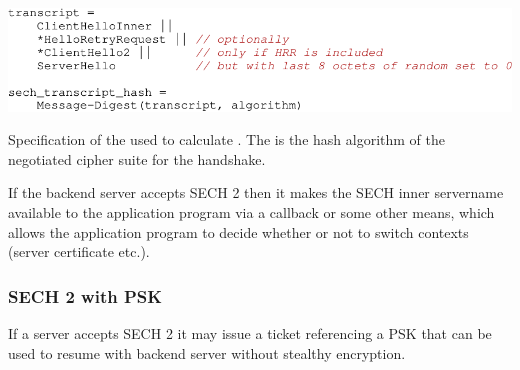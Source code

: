 \begin{listing}[htb]
\centering
\includegraphics[width=\linewidth]{figure/sech2-transcript-hash.pdf}
\captionsetup{width=.8\linewidth} 
\caption[SECH 2 Transcript Hash]{Specification of the  used to calculate . The  is the hash algorithm of the negotiated cipher suite for the handshake.}
\label{lst:sech2-transcript-hash}
\end{listing}



If the backend server accepts SECH 2 then it makes the SECH inner servername available to the application program via a callback or some other means, which allows the application program to decide whether or not to switch contexts (server certificate etc.).

\subsubsection{SECH 2 with PSK}
If a server accepts SECH 2 it may issue a ticket referencing a PSK that can be used to resume with backend server without stealthy encryption.

